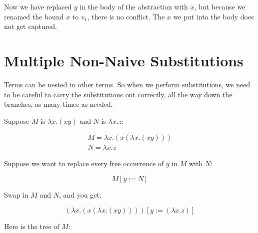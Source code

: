 \documentclass{book}
\numberwithin{equation}{chapter}
\begin{document}
\noindent
Now we have replaced $y$ in the body of the abstraction with $x$, but because we renamed the bound $x$ to $v_{1}$, there is no conflict. The $x$ we put into the body does not get captured.


\chapter{Multiple Non-Naive Substitutions}

Terms can be nested in other terms. So when we perform substitutions, we need to be careful to carry the substitutions out correctly, all the way down the branches, as many times as needed.

Suppose $M$ is $\lambda x.(x y)$ and $N$ is $\lambda x.z$:

\begin{align}
M = \lambda x.(x (\lambda x.(x y))) \\
N = \lambda x.z
\end{align}

\noindent
Suppose we want to replace every free occurrence of $y$ in $M$ with $N$:

\begin{equation}
M[y := N]
\end{equation}

\noindent
Swap in $M$ and $N$, and you get:

\begin{equation}
(\lambda x.(x (\lambda x.(x y))))[y := (\lambda x.z)]
\end{equation}

\noindent
Here is the tree of $M$:

\begin{center}
\end{center}
\end{document}
